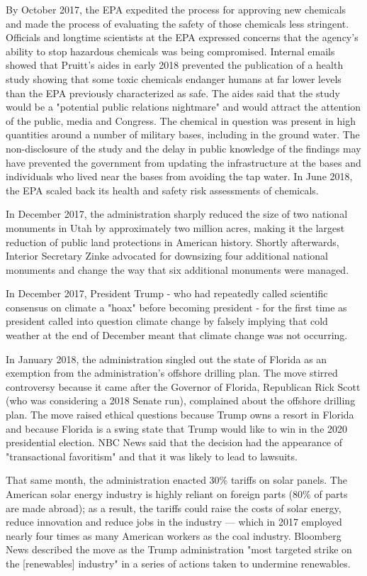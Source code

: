 By October 2017, the EPA expedited the process for approving new
chemicals and made the process of evaluating the safety of those
chemicals less stringent. Officials and longtime scientists at the EPA
expressed concerns that the agency's ability to stop hazardous chemicals
was being compromised. Internal emails showed that Pruitt's aides in
early 2018 prevented the publication of a health study showing that some
toxic chemicals endanger humans at far lower levels than the EPA
previously characterized as safe. The aides said that the study would be
a "potential public relations nightmare" and would attract the attention
of the public, media and Congress. The chemical in question was present
in high quantities around a number of military bases, including in the
ground water. The non-disclosure of the study and the delay in public
knowledge of the findings may have prevented the government from
updating the infrastructure at the bases and individuals who lived near
the bases from avoiding the tap water. In June 2018, the EPA scaled back
its health and safety risk assessments of chemicals.

In December 2017, the administration sharply reduced the size of two
national monuments in Utah by approximately two million acres, making it
the largest reduction of public land protections in American history.
Shortly afterwards, Interior Secretary Zinke advocated for downsizing
four additional national monuments and change the way that six
additional monuments were managed.

In December 2017, President Trump - who had repeatedly called scientific
consensus on climate a "hoax" before becoming president - for the first
time as president called into question climate change by falsely
implying that cold weather at the end of December meant that climate
change was not occurring.

In January 2018, the administration singled out the state of Florida as
an exemption from the administration's offshore drilling plan. The move
stirred controversy because it came after the Governor of Florida,
Republican Rick Scott (who was considering a 2018 Senate run),
complained about the offshore drilling plan. The move raised ethical
questions because Trump owns a resort in Florida and because Florida is
a swing state that Trump would like to win in the 2020 presidential
election. NBC News said that the decision had the appearance of
"transactional favoritism" and that it was likely to lead to lawsuits.

That same month, the administration enacted 30\% tariffs on solar
panels. The American solar energy industry is highly reliant on foreign
parts (80\% of parts are made abroad); as a result, the tariffs could
raise the costs of solar energy, reduce innovation and reduce jobs in
the industry --- which in 2017 employed nearly four times as many
American workers as the coal industry. Bloomberg News described the move
as the Trump administration "most targeted strike on the
{[}renewables{]} industry" in a series of actions taken to undermine
renewables.

